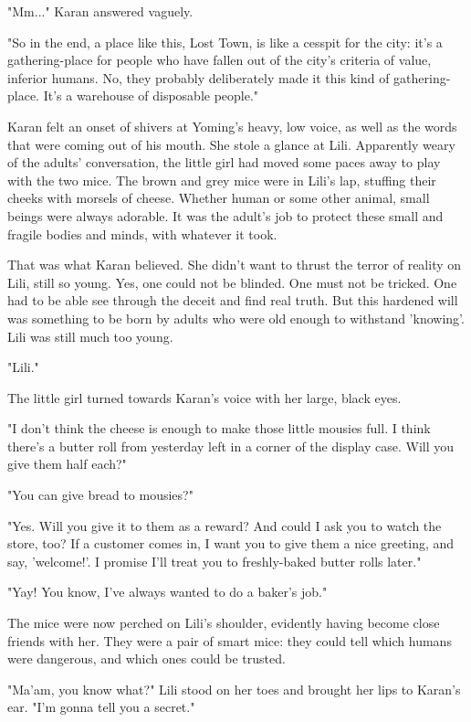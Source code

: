"Mm..." Karan answered vaguely.

"So in the end, a place like this, Lost Town, is like a cesspit for the
city: it's a gathering-place for people who have fallen out of the
city's criteria of value, inferior humans. No, they probably
deliberately made it this kind of gathering-place. It's a warehouse of
disposable people."

Karan felt an onset of shivers at Yoming's heavy, low voice, as well as
the words that were coming out of his mouth. She stole a glance at Lili.
Apparently weary of the adults' conversation, the little girl had moved
some paces away to play with the two mice. The brown and grey mice were
in Lili's lap, stuffing their cheeks with morsels of cheese. Whether
human or some other animal, small beings were always adorable. It was
the adult's job to protect these small and fragile bodies and minds,
with whatever it took.

That was what Karan believed. She didn't want to thrust the terror of
reality on Lili, still so young. Yes, one could not be blinded. One must
not be tricked. One had to be able see through the deceit and find real
truth. But this hardened will was something to be born by adults who
were old enough to withstand 'knowing'. Lili was still much too young.

"Lili."

The little girl turned towards Karan's voice with her large, black eyes.

"I don't think the cheese is enough to make those little mousies full. I
think there's a butter roll from yesterday left in a corner of the
display case. Will you give them half each?"

"You can give bread to mousies?"

"Yes. Will you give it to them as a reward? And could I ask you to watch
the store, too? If a customer comes in, I want you to give them a nice
greeting, and say, 'welcome!'. I promise I'll treat you to freshly-baked
butter rolls later."

"Yay! You know, I've always wanted to do a baker's job."

The mice were now perched on Lili's shoulder, evidently having become
close friends with her. They were a pair of smart mice: they could tell
which humans were dangerous, and which ones could be trusted.

"Ma'am, you know what?" Lili stood on her toes and brought her lips to
Karan's ear. "I'm gonna tell you a secret."


